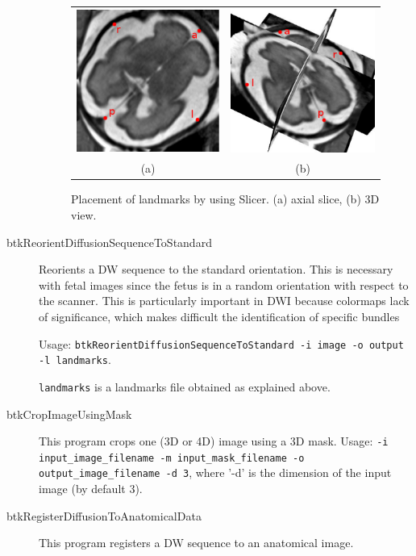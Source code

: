 \begin{description}
\begin{figure}[t]
\centering
\begin{tabular}{cc}
\includegraphics[width=0.35\columnwidth]{lmks_axial.eps}&
\includegraphics[width=0.35\columnwidth]{lmks_3D.eps}\\
{(a)}&{(b)}\\
\end{tabular}
\caption{Placement of landmarks by using Slicer. (a) axial slice, (b) 3D view.}
\label{fig:landmarks}
\end{figure}

  \item[btkReorientDiffusionSequenceToStandard] Reorients a DW sequence
to the standard orientation. This is necessary with fetal images since the fetus
is in a random orientation with respect to the scanner. This is particularly
important in DWI because colormaps lack of significance, which makes difficult
the identification of specific bundles 

Usage: \texttt{btkReorientDiffusionSequenceToStandard -i image -o output -l
landmarks}.

\texttt{landmarks} is a landmarks file obtained as explained above.

\item[btkCropImageUsingMask] This program crops one (3D or 4D) image using a 3D mask. Usage: \texttt{-i input\_image\_filename -m
input\_mask\_filename -o output\_image\_filename -d 3}, where '-d' is the dimension of the input image (by default 3).

\item[btkRegisterDiffusionToAnatomicalData] This program registers a DW
sequence to an anatomical image. 


\end{description}
